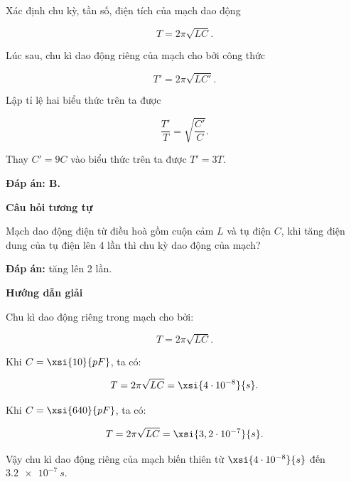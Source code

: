 \begin{dang}{Xác định chu kỳ, tần số, điện tích của mạch dao động}
{	$$T = 2\pi \sqrt{LC}.$$
	
	Lúc sau, chu kì dao động riêng của mạch cho bởi công thức 
	
	$$T' = 2\pi \sqrt{LC'}.$$ 
	
	Lập tỉ lệ hai biểu thức trên ta được
	
	$$\dfrac{T'}{T} = \sqrt{\dfrac{C'}{C}}.$$
	
	Thay $C' = 9C$ vào biểu thức trên ta được $T' = 3T$.
	
	\textbf{Đáp án: B.}
	
	\begin{center}
		\textbf{Câu hỏi tương tự}
	\end{center}
	
	Mạch dao động điện từ điều hoà gồm cuộn cảm $L$ và tụ điện $C$, khi tăng điện dung của tụ điện lên 4 lần thì chu kỳ dao động của mạch?
	
	\textbf{Đáp án:} tăng lên 2 lần.
}

	
	{	\begin{center}
			\textbf{Hướng dẫn giải}
		\end{center}
		
		Chu kì dao động riêng trong mạch cho bởi: 
		
		$$T = 2\pi \sqrt{LC}.$$
		
		Khi $C = \xsi{10}{pF}$, ta có:
		
		$$T = 2\pi \sqrt{LC} = \xsi{4\cdot10^{-8}}{s}.$$ 
		
		Khi $C = \xsi{640}{pF}$, ta có:
		
		$$T = 2\pi \sqrt{LC} = \xsi{3,2\cdot10^{-7}}{s}.$$ 
		
		Vậy chu kì dao động riêng của mạch biến thiên từ $\xsi{4\cdot10^{-8}}{s}$ đến $\SI{3,2 e-7}{s}$.
		
}
\end{dang}
